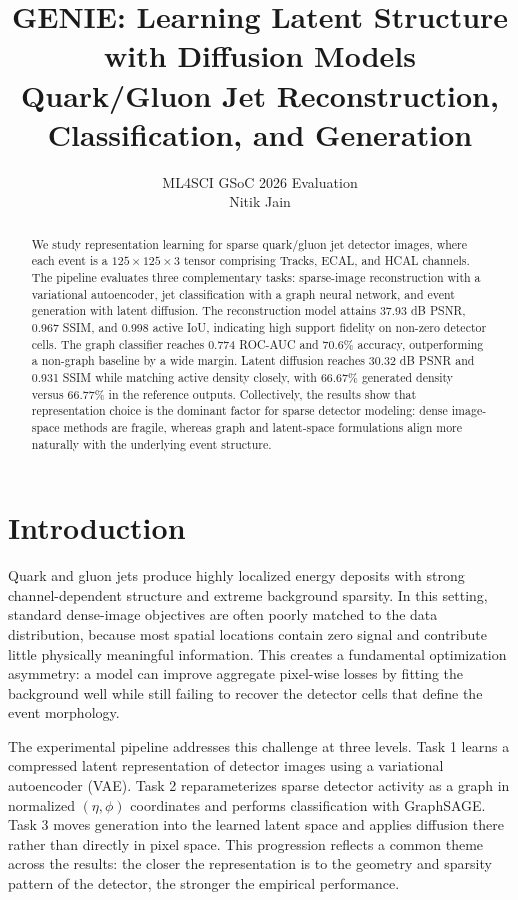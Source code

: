 \documentclass[11pt]{article}
\title{\bfseries GENIE: Learning Latent Structure with Diffusion Models\\[0.25em]
\large Quark/Gluon Jet Reconstruction, Classification, and Generation}
\author{ML4SCI GSoC 2026 Evaluation \\ Nitik Jain}
\date{}
\begin{document}
\maketitle

\begin{abstract}
We study representation learning for sparse quark/gluon jet detector images, where each event is a $125 \times 125 \times 3$ tensor comprising Tracks, ECAL, and HCAL channels. The pipeline evaluates three complementary tasks: sparse-image reconstruction with a variational autoencoder, jet classification with a graph neural network, and event generation with latent diffusion. The reconstruction model attains 37.93 dB PSNR, 0.967 SSIM, and 0.998 active IoU, indicating high support fidelity on non-zero detector cells. The graph classifier reaches 0.774 ROC-AUC and 70.6\% accuracy, outperforming a non-graph baseline by a wide margin. Latent diffusion reaches 30.32 dB PSNR and 0.931 SSIM while matching active density closely, with 66.67\% generated density versus 66.77\% in the reference outputs. Collectively, the results show that representation choice is the dominant factor for sparse detector modeling: dense image-space methods are fragile, whereas graph and latent-space formulations align more naturally with the underlying event structure.
\end{abstract}

\section{Introduction}
Quark and gluon jets produce highly localized energy deposits with strong channel-dependent structure and extreme background sparsity. In this setting, standard dense-image objectives are often poorly matched to the data distribution, because most spatial locations contain zero signal and contribute little physically meaningful information. This creates a fundamental optimization asymmetry: a model can improve aggregate pixel-wise losses by fitting the background well while still failing to recover the detector cells that define the event morphology.

The experimental pipeline addresses this challenge at three levels. Task 1 learns a compressed latent representation of detector images using a variational autoencoder (VAE). Task 2 reparameterizes sparse detector activity as a graph in normalized $(\eta,\phi)$ coordinates and performs classification with GraphSAGE. Task 3 moves generation into the learned latent space and applies diffusion there rather than directly in pixel space. This progression reflects a common theme across the results: the closer the representation is to the geometry and sparsity pattern of the detector, the stronger the empirical performance.
\end{document}
